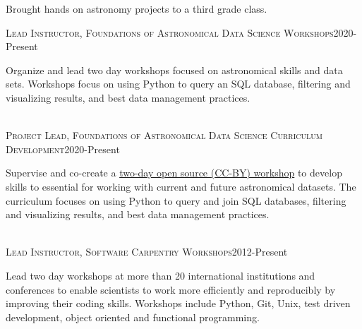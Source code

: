 \documentclass[10pt]{cv}
\begin{document}
\begin{llist}
\begin{minipage}[l]{0.7\textwidth}
Brought hands on astronomy projects to a third grade class.\\
\end{minipage}\vspace{0.15cm}
\vspace{-0.1in}   
\textsc{Lead Instructor, Foundations of Astronomical Data Science Workshops}\hfill 2020-Present\\
\begin{minipage}[l]{0.7\textwidth}\vspace{0.15cm}
Organize and lead two day workshops focused on astronomical skills and data sets. Workshops focus on using Python to query an SQL database, filtering and visualizing results, and best data management practices.  \\
\end{minipage}\vspace{0.15cm}
\\
\textsc{Project Lead, Foundations of Astronomical Data Science Curriculum Development}\hfill 2020-Present\\
\begin{minipage}[l]{0.7\textwidth}\vspace{0.15cm}
Supervise and co-create a \color{blue}\href{https://datacarpentry.org/astronomy-python/}{two-day open source (CC-BY) workshop}\color{black}{} to develop skills to essential for working with current and future astronomical datasets. The curriculum focuses on using Python to query and join SQL databases, filtering and visualizing results, and best data management practices.  \\
\end{minipage}\vspace{0.15cm}
\\
\textsc{Lead Instructor, Software Carpentry Workshops}\hfill 2012-Present\\
\begin{minipage}[l]{0.7\textwidth}\vspace{0.15cm}
Lead two day workshops at more than 20 international institutions and conferences to enable scientists to work more efficiently and reproducibly by improving their coding skills. Workshops include Python, Git, Unix, test driven development, object oriented and functional programming. \\

\end{minipage}
\end{llist}
\end{document}
